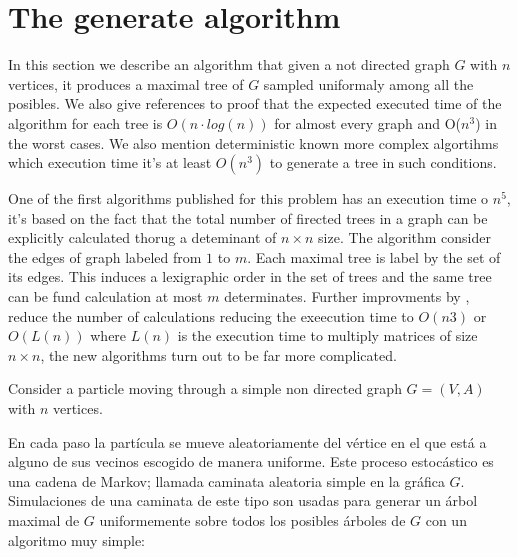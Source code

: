 
\chapter{The generate algorithm} %

\label{AppendixA} %


In this section we describe an algorithm that given a not directed graph $G$ with $n$ vertices, it produces a maximal tree of $G$ sampled uniformaly among all the posibles. We also give references to proof that the expected executed time of the algorithm for each tree is $O(n\cdot log(n) )$ for almost every graph and O($n^{3}$) in the worst cases. We also mention deterministic known more complex algortihms which execution time it's at least $O(n^{3})$ to generate a tree in such conditions.

One of the first algorithms published for this problem has an execution time o $n^{5}$, it's based on the fact that the total number of firected trees in a graph can be explicitly calculated thorug a deteminant of $n \times n$ size. The algorithm consider the edges of graph labeled from $1$ to $m$. Each maximal tree is label by the set of its edges. This induces a lexigraphic order in the set of trees and the same tree can be fund calculation at most $m$ determinates. Further improvments by \cite{CDN88}, \cite{CDM88} reduce the number of calculations reducing the exeecution time to  $O(n3)$ or $O(L(n))$ where $L(n)$ is the execution time to multiply  matrices of size $n\times n$, the new algorithms turn out to be far more complicated.



Consider a particle moving through a simple non directed graph $G=(V,A)$ with $n$ vertices. 

En cada paso la partícula se mueve aleatoriamente del vértice en el que está a alguno de sus vecinos escogido de manera uniforme. Este proceso estocástico es una cadena de Markov; llamada caminata aleatoria simple en la gráfica $G$. Simulaciones de una caminata de este tipo son usadas para generar un árbol maximal de $G$ uniformemente sobre todos los posibles árboles de $G$ con un algoritmo muy simple:

